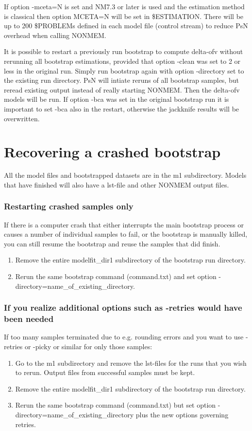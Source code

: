If option -mceta=N is set and NM7.3 or later is used and the estimation method is classical then option MCETA=N will be set in \$ESTIMATION. There will be up to 200 \$PROBLEMs defined in each model file (control stream) to reduce PsN overhead when calling NONMEM.

It is possible to restart a previously run bootstrap to compute delta-ofv without rerunning all bootstrap estimations, provided that option -clean was set to 2 or less in the original run. Simply run bootstrap again with option -directory set to the existing run directory. PsN will intiate reruns of all bootstrap samples, but reread existing output instead of really starting NONMEM. Then the delta-ofv models will be run. If option -bca was set in the original bootstrap run it is important to set -bca also in the restart, otherwise the jackknife results will be overwritten. 

\section{Recovering a crashed bootstrap}

All the model files and bootstrapped datasets are in the m1 subdirectory. Models that have finished will also have a 
lst-file and other NONMEM output files.  
\subsubsection*{Restarting crashed samples only}
If there is a computer crash that either interrupts the main bootstrap process or causes a number of individual samples to fail, or the bootstrap is manually killed, you can still resume the bootstrap and reuse the samples that did finish.
\begin{enumerate}
    \item Remove the entire modelfit\_dir1 subdirectory of the bootstrap run directory.
	\item Rerun the same bootstrap command (command.txt) and set option -directory=name\_of\_existing\_directory. 
\end{enumerate}

\subsubsection*{If you realize additional options such as -retries would have been needed}
If too many samples terminated due to e.g. rounding errors and you want to use -retries or -picky or similar for only those samples:
\begin{enumerate}
	\item Go to the m1 subdirectory and remove the lst-files for the runs that you wish to rerun. Output files from successful samples must be kept.
    \item Remove the entire modelfit\_dir1 subdirectory of the bootstrap run directory.
	\item Rerun the same bootstrap command 
(command.txt) but set option -directory=name\_of\_existing\_directory 
plus the new options governing retries.
\end{enumerate}

